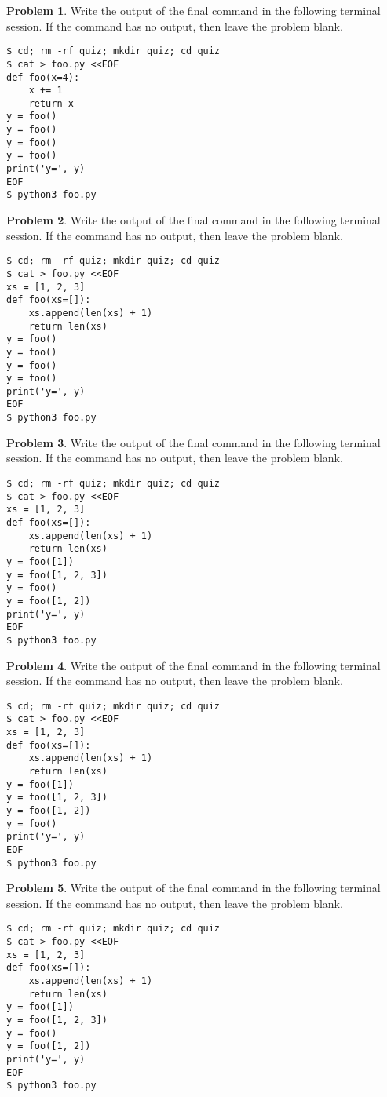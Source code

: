 \documentclass[10pt]{article}
\theoremstyle{definition}
\newtheorem{problem}{Problem}
\begin{document}
\filbreak
\begin{problem}
    Write the output of the final command in the following terminal session.
    If the command has no output, then leave the problem blank.
\end{problem}
\begin{lstlisting}
$ cd; rm -rf quiz; mkdir quiz; cd quiz
$ cat > foo.py <<EOF
def foo(x=4):
    x += 1
    return x
y = foo()
y = foo()
y = foo()
y = foo()
print('y=', y)
EOF
$ python3 foo.py
\end{lstlisting}

\filbreak
\begin{problem}
    Write the output of the final command in the following terminal session.
    If the command has no output, then leave the problem blank.
\end{problem}
\begin{lstlisting}
$ cd; rm -rf quiz; mkdir quiz; cd quiz
$ cat > foo.py <<EOF
xs = [1, 2, 3]
def foo(xs=[]):
    xs.append(len(xs) + 1)
    return len(xs)
y = foo()
y = foo()
y = foo()
y = foo()
print('y=', y)
EOF
$ python3 foo.py
\end{lstlisting}


\filbreak
\begin{problem}
    Write the output of the final command in the following terminal session.
    If the command has no output, then leave the problem blank.
\end{problem}
\begin{lstlisting}
$ cd; rm -rf quiz; mkdir quiz; cd quiz
$ cat > foo.py <<EOF
xs = [1, 2, 3]
def foo(xs=[]):
    xs.append(len(xs) + 1)
    return len(xs)
y = foo([1])
y = foo([1, 2, 3])
y = foo()
y = foo([1, 2])
print('y=', y)
EOF
$ python3 foo.py
\end{lstlisting}


\filbreak
\begin{problem}
    Write the output of the final command in the following terminal session.
    If the command has no output, then leave the problem blank.
\end{problem}
\begin{lstlisting}
$ cd; rm -rf quiz; mkdir quiz; cd quiz
$ cat > foo.py <<EOF
xs = [1, 2, 3]
def foo(xs=[]):
    xs.append(len(xs) + 1)
    return len(xs)
y = foo([1])
y = foo([1, 2, 3])
y = foo([1, 2])
y = foo()
print('y=', y)
EOF
$ python3 foo.py
\end{lstlisting}

\filbreak
\begin{problem}
    Write the output of the final command in the following terminal session.
    If the command has no output, then leave the problem blank.
\end{problem}
\begin{lstlisting}
$ cd; rm -rf quiz; mkdir quiz; cd quiz
$ cat > foo.py <<EOF
xs = [1, 2, 3]
def foo(xs=[]):
    xs.append(len(xs) + 1)
    return len(xs)
y = foo([1])
y = foo([1, 2, 3])
y = foo()
y = foo([1, 2])
print('y=', y)
EOF
$ python3 foo.py
\end{lstlisting}
\end{document}
